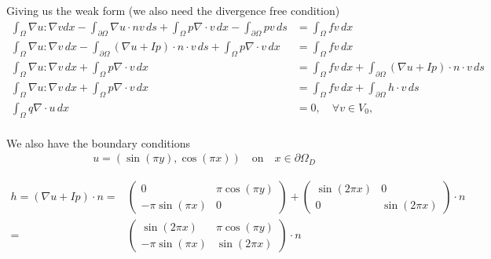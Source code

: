 \documentclass[a4paper,12pt]{article}
\theoremstyle{exerciseStyle}
\theoremstyle{solutionStyle}
\begin{document}
\begin{solution}{6.6}
    Giving us the weak form (we also need the divergence free condition)
    \begin{align*}
        \int_{\Omega} \nabla u : \nabla v dx - \int_{\partial \Omega} \nabla u \cdot n v  \, ds +  \int_{\Omega} p \nabla \cdot v \, dx - \int_{\partial \Omega} p v \, ds & = \int_{\Omega} f v \, dx                                                                                 \\
        \int_{\Omega} \nabla u : \nabla v \, dx  - \int_{\partial \Omega} (\nabla u + Ip) \cdot n \cdot v  \, ds + \int_{\Omega} p \nabla \cdot v \, dx                    & = \int_{\Omega} f v \, dx                                                                                 \\
        \int_{\Omega} \nabla u : \nabla v \, dx  + \int_{\Omega} p \nabla \cdot v \, dx                                                                                    & = \int_{\Omega} f v \, dx +   \int_{\partial \Omega} \left( \nabla u + I p \right) \cdot n \cdot v  \, ds \\
        \int_{\Omega} \nabla u : \nabla v \, dx  + \int_{\Omega} p \nabla \cdot v \, dx                                                                                    & = \int_{\Omega} f v \, dx +   \int_{\partial \Omega} h \cdot v  \, ds                                     \\
        \int_{\Omega} q \nabla \cdot u \, dx                                                                                                                               & = 0, \quad \forall v \in V_0,                                                                             \\
    \end{align*}

    We also have the boundary conditions
    \begin{align*}
        u = (\sin(\pi y), \cos(\pi x)) \quad \text{on} \quad x \in \partial \Omega_D
    \end{align*}

    \begin{align*}
        h = (\nabla u + I p)\cdot n = & \begin{pmatrix}
                                            0                & \pi \cos(\pi y) \\
                                            -\pi \sin(\pi x) & 0
                                        \end{pmatrix} +
        \begin{pmatrix}
            \sin(2 \pi x) & 0             \\
            0             & \sin(2 \pi x)
        \end{pmatrix}
        \cdot n                                                            \\
        =                             &
        \begin{pmatrix}
            \sin(2 \pi x)    & \pi \cos(\pi y) \\
            -\pi \sin(\pi x) & \sin(2 \pi x)
        \end{pmatrix} \cdot n
    \end{align*}


\end{solution}
\end{document}
